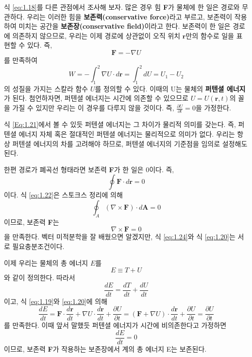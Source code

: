 \documentclass[chapter, oneside, b5paper]{oblivoir}
\theoremstyle{plain}
\theoremstyle{definition}
\theoremstyle{remark}
\begin{document}
식 \ref{eq:1.18}를 다른 관점에서 조사해 보자. 많은 경우 힘 \textbf{F}가 물체에 한 일은 경로와 무관하다. 우리는 이러한 힘을 \textbf{보존력(conservative force)}라고 부르고, 보존력이 작용하여 미치는 공간을 \textbf{보존장(conservative field)}이라고 한다. 보존력이 한 일은 경로에 의존하지 않으므로, 우리는 이제 경로에 상관없이 오직 위치 $\textbf{r}$만의 함수로 일을 표현할 수 있다. 즉,
\begin{equation}
    \textbf{F} = -\nabla U \label{eq:1.20}
\end{equation}
를 만족하여
\begin{equation}
    W = -\int_{1}^{2} \nabla U \cdot d\textbf{r} = \int_{1}^{2} dU = U_1-U_2 \label{Eq:1.21}
\end{equation}
의 성질을 가지는 스칼라 함수 $U$를 정의할 수 있다. 이때의 U는 물체의 \textbf{퍼텐셜 에너지}가 된다. 첨언하자면, 퍼텐셜 에너지는 시간에 의존할 수 있으므로 $U=U(\textbf{r}, t)$의 꼴을 가질 수 있지만 우리는 이 경우를 다루지 않을 것이다. 즉, $\frac{\partial U}{\partial t} = 0$을 가정한다.

식 \ref{Eq:1.21}에서 볼 수 있듯 퍼텐셜 에너지는 그 차이가 물리적 의미를 갖는다. 즉, 퍼텐셜 에너지 자체 혹은 절대적인 퍼텐셜 에너지는 물리적으로 의미가 없다. 우리는 항상 퍼텐셜 에너지의 차를 고려해야 하므로, 퍼텐셜 에너지의 기준점을 임의로 설정해도 된다.

한편 경로가 폐곡선 형태라면 보존력 \textbf{F}가 한 일은 0이다. 즉,
\begin{equation}
    \oint \textbf{F} \cdot d\textbf{r} = 0 \label{eq:1.22}
\end{equation}
이다. 식 \ref{eq:1.22}은 스토크스 정리에 의해
\begin{equation}
    \oint_{A} (\nabla \times \textbf{F}) \cdot d\textbf{A} = 0 \label{eq:1.23}
\end{equation}
이므로, 보존력 \textbf{F}는
\begin{equation}
    \nabla \times \textbf{F} = 0 \label{eq:1.24}
\end{equation}
을 만족한다. 벡터 미적분학을 잘 배웠으면 알겠지만, 식 \ref{eq:1.24}와 식 \ref{eq:1.20}는 서로 필요충분조건이다.

이제 우리는 물체의 총 에너지 $E$를
\begin{equation}
    E \equiv T + U \label{eq:1.25}
\end{equation}
와 같이 정의한다. 따라서
\begin{equation}
    \frac{dE}{dt} = \frac{dT}{dt} + \frac{dU}{dt} \label{eq:1.26}
\end{equation}
이고, 식 \ref{eq:1.19}와 \ref{eq:1.20}에 의해
\begin{equation}
    \frac{dE}{dt} = \textbf{F} \cdot \frac{d\textbf{r}}{dt} + \nabla U \cdot \frac{d\textbf{r}}{dt} + \frac{\partial U}{\partial t} = (\textbf{F}+\nabla U) \cdot \frac{d\textbf{r}}{dt} + \frac{\partial U}{\partial t} = \frac{\partial U}{\partial t} \label{eq:1.27}
\end{equation}
를 만족한다. 이때 앞서 말했듯 퍼텐셜 에너지가 시간에 비의존한다고 가정하면
\begin{equation}
    \frac{dE}{dt} = 0 \label{eq:1.28}
\end{equation}
이므로, 보존력 \textbf{F}가 작용하는 보존장에서 계의 총 에너지 E는 보존된다.
\end{document}
